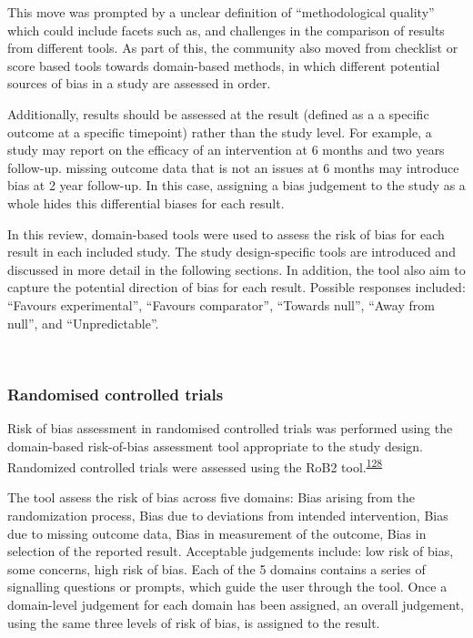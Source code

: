 \documentclass[a4paper, twoside]{templates/ociamthesis}
\begin{document}
This move was prompted by a unclear definition of ``methodological quality'' which could include facets such as, and challenges in the comparison of results from different tools. As part of this, the community also moved from checklist or score based tools towards domain-based methods, in which different potential sources of bias in a study are assessed in order.

Additionally, results should be assessed at the result (defined as a a specific outcome at a specific timepoint) rather than the study level. For example, a study may report on the efficacy of an intervention at 6 months and two years follow-up. missing outcome data that is not an issues at 6 months may introduce bias at 2 year follow-up. In this case, assigning a bias judgement to the study as a whole hides this differential biases for each result.

In this review, domain-based tools were used to assess the risk of bias for each result in each included study. The study design-specific tools are introduced and discussed in more detail in the following sections. In addition, the tool also aim to capture the potential direction of bias for each result. Possible responses included: ``Favours experimental'', ``Favours comparator'', ``Towards null'', ``Away from null'', and ``Unpredictable''.

~

\hypertarget{randomised-controlled-trials-1}{%
\subsubsection{Randomised controlled trials}\label{randomised-controlled-trials-1}}

Risk of bias assessment in randomised controlled trials was performed using the domain-based risk-of-bias assessment tool appropriate to the study design. Randomized controlled trials were assessed using the RoB2 tool.\textsuperscript{\protect\hyperlink{ref-sterne2019}{128}}

The tool assess the risk of bias across five domains: Bias arising from the randomization process, Bias due to deviations from intended intervention, Bias due to missing outcome data, Bias in measurement of the outcome, Bias in selection of the reported result. Acceptable judgements include: low risk of bias, some concerns, high risk of bias. Each of the 5 domains contains a series of signalling questions or prompts, which guide the user through the tool. Once a domain-level judgement for each domain has been assigned, an overall judgement, using the same three levels of risk of bias, is assigned to the result.
\end{document}
